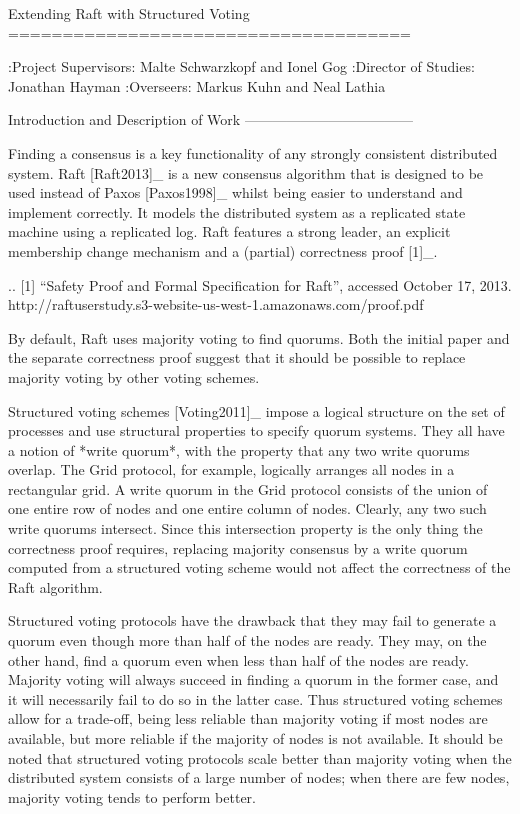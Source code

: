 Extending Raft with Structured Voting
=====================================

:Project Supervisors: Malte Schwarzkopf and Ionel Gog
:Director of Studies: Jonathan Hayman
:Overseers: Markus Kuhn and Neal Lathia

Introduction and Description of Work
------------------------------------

Finding a consensus is a key functionality of any strongly consistent distributed system. Raft [Raft2013]_ is a new consensus algorithm that is designed to be used instead of Paxos [Paxos1998]_ whilst being easier to understand and implement correctly. It models the distributed system as a replicated state machine using a replicated log. Raft features a strong leader, an explicit membership change mechanism and a (partial) correctness proof [1]_.

.. [1] “Safety Proof and Formal Specification for Raft”, accessed October 17, 2013. http://raftuserstudy.s3-website-us-west-1.amazonaws.com/proof.pdf

By default, Raft uses majority voting to find quorums. Both the initial paper and the separate correctness proof suggest that it should be possible to replace majority voting by other voting schemes.

Structured voting schemes [Voting2011]_ impose a logical structure on the set of processes and use structural properties to specify quorum systems. They all have a notion of *write quorum*, with the property that any two write quorums overlap. The Grid protocol, for example, logically arranges all nodes in a rectangular grid. A write quorum in the Grid protocol consists of the union of one entire row of nodes and one entire column of nodes. Clearly, any two such write quorums intersect. Since this intersection property is the only thing the correctness proof requires, replacing majority consensus by a write quorum computed from a structured voting scheme would not affect the correctness of the Raft algorithm.

Structured voting protocols have the drawback that they may fail to generate a quorum even though more than half of the nodes are ready. They may, on the other hand, find a quorum even when less than half of the nodes are ready. Majority voting will always succeed in finding a quorum in the former case, and it will necessarily fail to do so in the latter case. Thus structured voting schemes allow for a trade-off, being less reliable than majority voting if most nodes are available, but more reliable if the majority of nodes is not available. It should be noted that structured voting protocols scale better than majority voting when the distributed system consists of a large number of nodes; when there are few nodes, majority voting tends to perform better.

